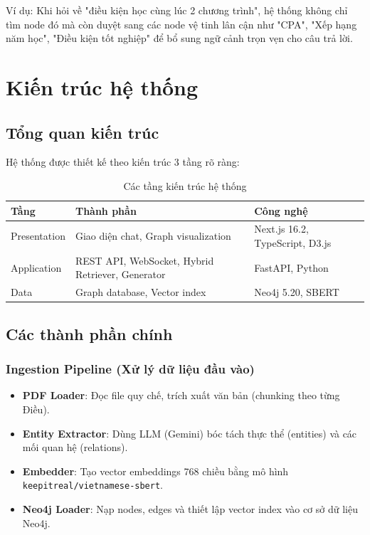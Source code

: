\documentclass[12pt,a4paper]{article}
\begin{document}
Ví dụ: Khi hỏi về "điều kiện học cùng lúc 2 chương trình", hệ thống không chỉ tìm node đó mà còn duyệt sang các node vệ tinh lân cận như "CPA", "Xếp hạng năm học", "Điều kiện tốt nghiệp" để bổ sung ngữ cảnh trọn vẹn cho câu trả lời.

\section{Kiến trúc hệ thống}
\subsection{Tổng quan kiến trúc}
Hệ thống được thiết kế theo kiến trúc 3 tầng rõ ràng:
\begin{table}[H]
\centering
\caption{Các tầng kiến trúc hệ thống}
\begin{tabularx}{\textwidth}{lXl}
\toprule
\textbf{Tầng} & \textbf{Thành phần} & \textbf{Công nghệ} \\
\midrule
Presentation & Giao diện chat, Graph visualization & Next.js 16.2, TypeScript, D3.js \\
Application & REST API, WebSocket, Hybrid Retriever, Generator & FastAPI, Python \\
Data & Graph database, Vector index & Neo4j 5.20, SBERT \\
\bottomrule
\end{tabularx}
\end{table}

\subsection{Các thành phần chính}
\subsubsection{Ingestion Pipeline (Xử lý dữ liệu đầu vào)}
\begin{itemize}
\item \textbf{PDF Loader}: Đọc file quy chế, trích xuất văn bản (chunking theo từng Điều).
\item \textbf{Entity Extractor}: Dùng LLM (Gemini) bóc tách thực thể (entities) và các mối quan hệ (relations).
\item \textbf{Embedder}: Tạo vector embeddings 768 chiều bằng mô hình \texttt{keepitreal/vietnamese-sbert}.
\item \textbf{Neo4j Loader}: Nạp nodes, edges và thiết lập vector index vào cơ sở dữ liệu Neo4j.
\end{itemize}
\end{document}
